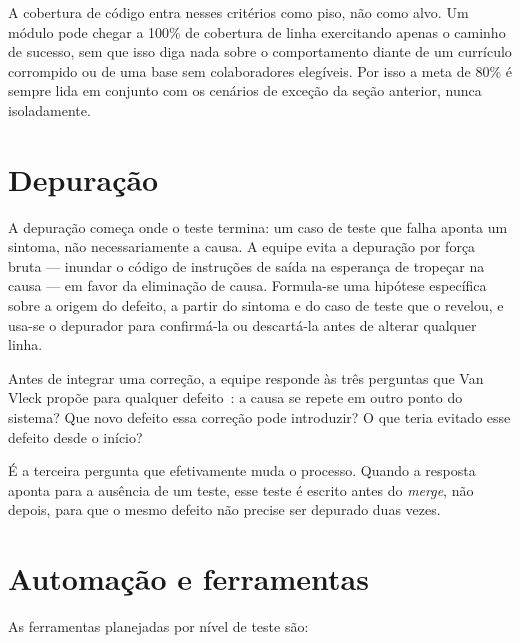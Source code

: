 \documentclass[a4paper,12pt,oneside,openany]{book}
\newif\iforientacoes
\newcommand{\orientacao}[1]{%
    \iforientacoes
        \begin{quote}
        \small\itshape\textbf{Orientação:} #1
        \end{quote}
    \fi
}
\begin{document}
A cobertura de código entra nesses critérios como piso, não como alvo. Um
módulo pode chegar a 100\% de cobertura de linha exercitando apenas o caminho
de sucesso, sem que isso diga nada sobre o comportamento diante de um currículo
corrompido ou de uma base sem colaboradores elegíveis. Por isso a meta de 80\%
é sempre lida em conjunto com os cenários de exceção da seção anterior, nunca
isoladamente.

\section{Depuração}

\orientacao{Descrevam, ainda que brevemente, como a equipe pretende
investigar e corrigir os defeitos revelados pelos testes, e não apenas como
os testes serão executados.}

A depuração começa onde o teste termina: um caso de teste que falha aponta um
sintoma, não necessariamente a causa. A equipe evita a depuração por força
bruta --- inundar o código de instruções de saída na esperança de tropeçar na
causa --- em favor da eliminação de causa. Formula-se uma hipótese específica
sobre a origem do defeito, a partir do sintoma e do caso de teste que o
revelou, e usa-se o depurador para confirmá-la ou descartá-la antes de alterar
qualquer linha.

Antes de integrar uma correção, a equipe responde às três perguntas que Van
Vleck propõe para qualquer defeito~\citep{vanvleck2011}: a causa se repete em
outro ponto do sistema? Que novo defeito essa correção pode introduzir? O que
teria evitado esse defeito desde o início?

É a terceira pergunta que efetivamente muda o processo. Quando a resposta
aponta para a ausência de um teste, esse teste é escrito antes do
\textit{merge}, não depois, para que o mesmo defeito não precise ser depurado
duas vezes.

\section{Automação e ferramentas}\label{sec:automacao-ferramentas}

\orientacao{Descrevam as ferramentas utilizadas ou planejadas para executar
testes, gerar relatórios e, quando aplicável, automatizar sua execução.}

As ferramentas planejadas por nível de teste são:
\end{document}
